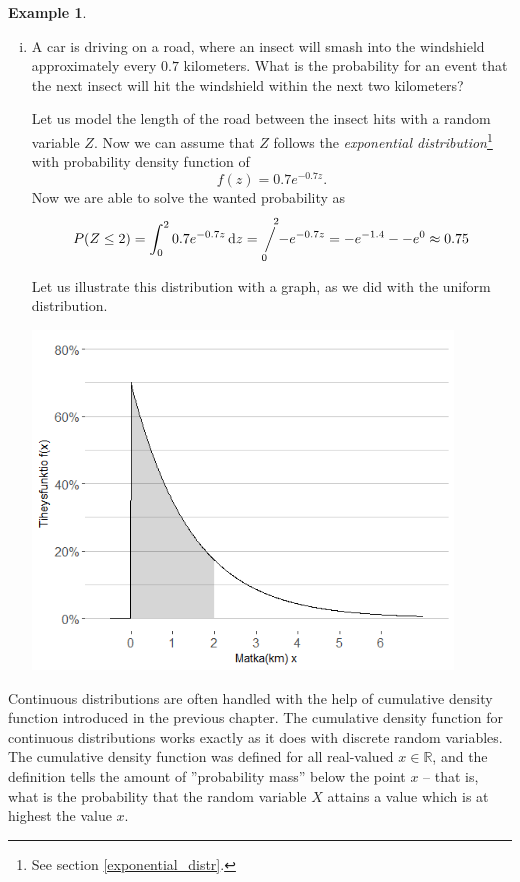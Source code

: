 \documentclass[12pt,a4paper,leqno]{report}
\newcommand{\R}{\mathbb{R}}
\newcommand{\dif}{\,\mathrm{d}}
\newcommand{\sijoitus}[2]{\mathop{\Big/}\limits_{\hspace{-0.85em}{#1}}^{\hspace{0.85em}{#2}}\hspace{-0.2em}}
\theoremstyle{plain}
\theoremstyle{definition}
\newtheorem{esim}[equation]{Example}
\begin{document}
\begin{esim}
\begin{enumerate}[(i)]
\item A car is driving on a road, where an insect will smash into the windshield approximately every $0.7$ kilometers. What is the probability for an event that the next insect will hit the windshield within the next two kilometers?

Let us model the length of the road between the insect hits with a random variable $Z$. Now we can assume that $Z$ follows the \emph{exponential distribution}\footnote{See section \ref{exponential_distr}.} with probability density function of  
\[
f(z) = 0.7 e^{-0.7z}.
\]
Now we are able to solve the wanted probability as
\[
P(Z \leq 2) = \int_0^2 0.7 e^{-0.7z}\dif{z} = \sijoitus{0}{2} -e^{-0.7z} = -e^{-1.4} - -e^0 \approx 0.75
\]

Let us illustrate this distribution with a graph, as we did with the uniform distribution.

\begin{center}
\includegraphics[height = 9cm]{auto.png}
\end{center}
\end{enumerate}
\end{esim}

Continuous distributions are often handled with the help of cumulative density function introduced in the previous chapter. The cumulative density function for continuous distributions works exactly as it does with discrete random variables. The cumulative density function was defined for all real-valued $x \in \R$, and the definition tells the amount of ''probability mass'' below the point $x$ -- that is, what is the probability that the random variable $X$ attains a value which is at highest the value $x$.
\end{document}
